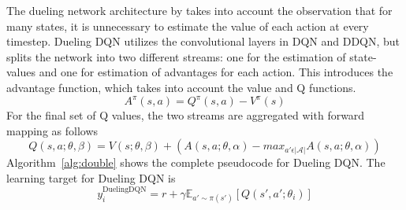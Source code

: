 \documentclass{article}
\begin{document}
The dueling network architecture by \cite{wang2016dueling} takes into account the 
observation that for many states, it is unnecessary to estimate the value of each 
action at every timestep. Dueling DQN utilizes the convolutional layers in DQN and 
DDQN, but splits the network into two different streams: one for the estimation of
state-values and one for estimation of advantages for each action. This introduces 
the advantage function, which takes into account the value and Q functions.
\begin{equation}
    A^{\pi}(s, a) = Q^{\pi}(s,a) - V^{\pi}(s)
\end{equation}
For the final set of Q values, the two streams are aggregated with forward mapping
as follows
\begin{equation}
    Q(s,a; \theta, \beta)  = V(s; \theta, \beta) + (A(s, a; \theta, \alpha) - 
    max_{a' \epsilon \vert \mathcal{A} \vert} A(s, a; \theta, \alpha))
\end{equation}
Algorithm~\ref{alg:double} shows the complete pseudocode for Dueling DQN.
The learning target for Dueling DQN is
\begin{equation}
    y_i^{\text{DuelingDQN}} = r + \gamma \mathbb{E}_{a' \sim \pi (s') }
    [Q(s', a'; \theta_{i})]
\end{equation}
\end{document}
